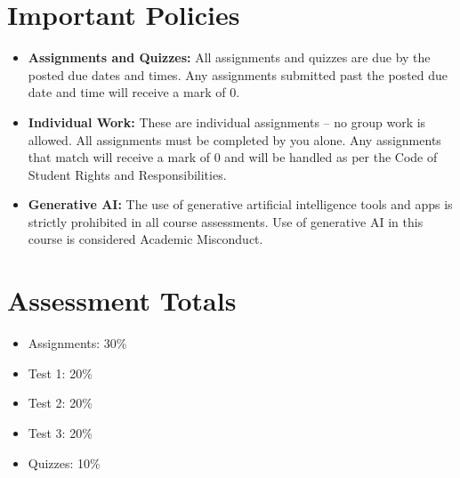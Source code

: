 \documentclass{article}
\begin{document}
\section*{Important Policies}
\begin{itemize}
    \item \textbf{Assignments and Quizzes:} All assignments and quizzes are due by the posted due dates and times. Any assignments submitted past the posted due date and time will receive a mark of 0.
    \item \textbf{Individual Work:} These are individual assignments – no group work is allowed. All assignments must be completed by you alone. Any assignments that match will receive a mark of 0 and will be handled as per the Code of Student Rights and Responsibilities.
    \item \textbf{Generative AI:} The use of generative artificial intelligence tools and apps is strictly prohibited in all course assessments. Use of generative AI in this course is considered Academic Misconduct.
\end{itemize}
\newpage
\section*{Assessment Totals}
\begin{itemize}
    \item Assignments: 30\%
    \item Test 1: 20\%
    \item Test 2: 20\%
    \item Test 3: 20\%
    \item Quizzes: 10\%
\end{itemize}
\end{document}
